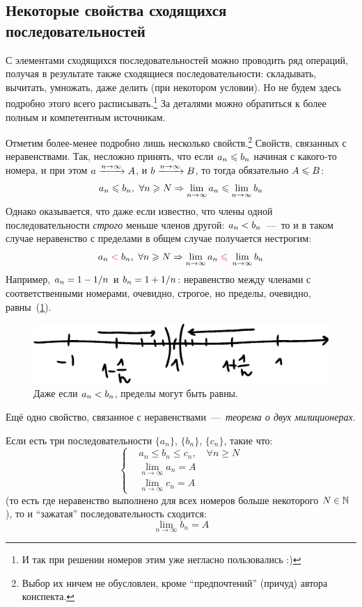 \documentclass[a4paper,12pt]{article}
\begin{document}
  
  \subsection{Некоторые свойства сходящихся последовательностей}
  
  С элементами сходящихся последовательностей можно проводить ряд операций, получая в результате также сходящиеся последовательности: складывать, вычитать, умножать, даже делить (при некотором условии).
  Но не будем здесь подробно этого всего расписывать.\footnote{И так при решении номеров этим уже негласно пользовались :)}
  За деталями можно обратиться к более полным и компетентным источникам.
  
  Отметим более-менее подробно лишь несколько свойств.\footnote{Выбор их ничем не обусловлен, кроме ``предпочтений'' (причуд) автора конспекта.}
  Свойств, связанных с неравенствами.
  Так, несложно принять, что если $a_n \hm\leq b_n$ начиная с какого-то номера, и при этом $a \hm{\xrightarrow{n \to \infty}} A$, и $b \hm{\xrightarrow{n \to \infty}} B$, то тогда обязательно $A \hm\leq B$:
  \[
    a_n \hm\leq b_n,\ \forall n \geq N \Rightarrow \lim_{n \to\infty} a_n \leq \lim_{n \to \infty} b_n
  \]
  Однако оказывается, что даже если известно, что члены одной последовательности \emph{строго} меньше членов другой: $a_n \hm< b_n$~---~то и в таком случае неравенство с пределами в общем случае получается нестрогим:
  \[
    a_n \textcolor{pink}{{}<{}} b_n,\ \forall n \geq N \Rightarrow \lim_{n \to\infty} a_n \textcolor{pink}{{}\leq{}} \lim_{n \to \infty} b_n
  \]
  Например, $a_n \hm= 1 \hm- 1\hm/n$ и $b_n \hm= 1 \hm+ 1\hm/ n$: неравенство между членами с соответственными номерами, очевидно, строгое, но пределы, очевидно, равны~(\ref{fig:an-less-than-bn}).
  
  \begin{figure}[ht]
    \centering
    \includegraphics[width=0.6\linewidth]{images/an-less-than-bn}
    
    \caption{
      Даже если $a_n \hm< b_n$, пределы могут быть равны.
    }
    \label{fig:an-less-than-bn}
  \end{figure}
  
  Ещё одно свойство, связанное с неравенствами~---~\emph{теорема о двух милиционерах}.
  
  \begin{proposition}
    Если есть три последовательности $\{a_n\}$, $\{b_n\}$, $\{c_n\}$, такие что:
    \[
      \left\{
        \begin{aligned}
          &a_n \leq b_n \leq c_n,\quad \forall n \geq N\\
          &\lim_{n\to \infty} a_n = A\\
          &\lim_{n\to \infty} c_n = A
        \end{aligned}
      \right.
    \]
    (то есть где неравенство выполнено для всех номеров больше некоторого $N \hm\in \NN$), то и ``зажатая'' последовательность сходится:
    \[
      \lim_{n\to \infty} b_n = A
    \]
  \end{proposition}
  
\end{document}
